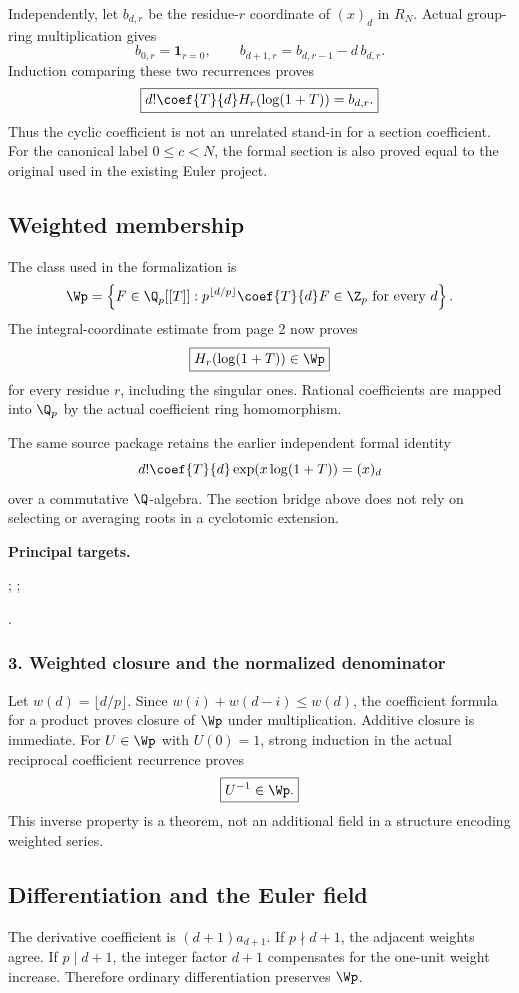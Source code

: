 Independently, let $b_{d,r}$ be the residue-$r$ coordinate of $(x)_d$ in $R_N$. Actual group-ring multiplication gives
\[
 b_{0,r}=\mathbf1_{r=0},\qquad
 b_{d+1,r}=b_{d,r-1}-d\,b_{d,r}.
\]
Induction comparing these two recurrences proves
\[
 \boxed{d!\coef{T}{d}H_r(\log(1+T))=b_{d,r}.}
\]
Thus the cyclic coefficient is not an unrelated stand-in for a section coefficient. For the canonical label $0\le c<N$, the formal section is also proved equal to the original \allowbreak{} used in the existing Euler project.

\subsection*{Weighted membership}
The class used in the formalization is
\[
 \Wp=\left\{F\in\Q_p[[T]]:
 p^{\lfloor d/p\rfloor}\coef{T}{d}F\in\Z_p\ \text{for every }d\right\}.
\]
The integral-coordinate estimate from page 2 now proves
\[
 \boxed{H_r(\log(1+T))\in\Wp}
\]
for every residue $r$, including the singular ones. Rational coefficients are mapped into $\Q_p$ by the actual coefficient ring homomorphism.

The same source package retains the earlier independent formal identity
\[
 d!\coef{T}{d}\exp(x\log(1+T))=(x)_d
\]
over a commutative $\Q$-algebra. The section bridge above does not rely on selecting or averaging roots in a cyclotomic extension.

\textbf{Principal targets.}\par {}; ;\par {}.
\par\medskip
\subsubsection*{3. Weighted closure and the normalized denominator}
Let $w(d)=\lfloor d/p\rfloor$. Since $w(i)+w(d-i)\le w(d)$, the coefficient formula for a product proves closure of $\Wp$ under multiplication. Additive closure is immediate. For $U\in\Wp$ with $U(0)=1$, strong induction in the actual reciprocal coefficient recurrence proves
\[
 \boxed{U^{-1}\in\Wp.}
\]
This inverse property is a theorem, not an additional field in a structure encoding weighted series.

\subsection*{Differentiation and the Euler field}
The derivative coefficient is $(d+1)a_{d+1}$. If $p\nmid d+1$, the adjacent weights agree. If $p\mid d+1$, the integer factor $d+1$ compensates for the one-unit weight increase. Therefore ordinary differentiation preserves $\Wp$.

